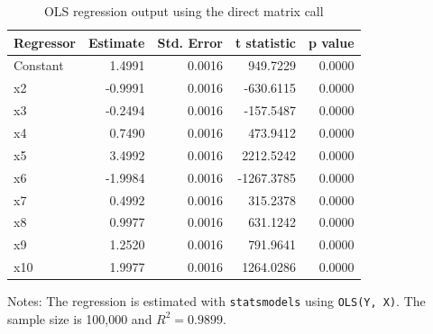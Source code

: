 \begin{table}[H]
\centering
\caption{OLS regression output using the direct matrix call}
\label{tab:ols}
\begin{tabular}{lrrrr}
\toprule
Regressor & Estimate & Std. Error & t statistic & p value \\
\midrule
Constant & 1.4991 & 0.0016 & 949.7229 & 0.0000 \\
x2 & -0.9991 & 0.0016 & -630.6115 & 0.0000 \\
x3 & -0.2494 & 0.0016 & -157.5487 & 0.0000 \\
x4 & 0.7490 & 0.0016 & 473.9412 & 0.0000 \\
x5 & 3.4992 & 0.0016 & 2212.5242 & 0.0000 \\
x6 & -1.9984 & 0.0016 & -1267.3785 & 0.0000 \\
x7 & 0.4992 & 0.0016 & 315.2378 & 0.0000 \\
x8 & 0.9977 & 0.0016 & 631.1242 & 0.0000 \\
x9 & 1.2520 & 0.0016 & 791.9641 & 0.0000 \\
x10 & 1.9977 & 0.0016 & 1264.0286 & 0.0000 \\
\bottomrule
\end{tabular}
\vspace{0.15cm}
\parbox{0.9\textwidth}{\small Notes: The regression is estimated with \texttt{statsmodels} using \texttt{OLS(Y, X)}. The sample size is 100,000 and $R^2 = 0.9899$.}
\end{table}
